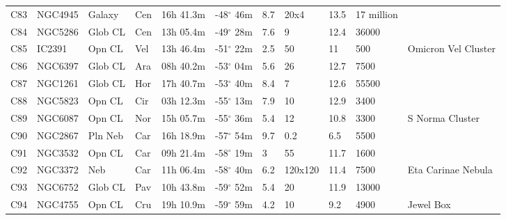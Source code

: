 \documentclass[10pt,twoside,a4paper,english]{article}
\begin{document}
\begin{longtable}{@{}lllllllllll@{}}
C83        & NGC4945     & Galaxy     & Cen       & 16h 41.3m & -48$^{\circ}$ 46m  & 8.7       & 20x4                 & 13.5     & 17 million          &                                 \\ 
C84        & NGC5286     & Glob CL    & Cen       & 13h 05.4m & -49$^{\circ}$ 28m  & 7.6       & 9                    & 12.4     & 36000               &                                 \\ 
C85        & IC2391      & Opn CL     & Vel       & 13h 46.4m & -51$^{\circ}$ 22m  & 2.5       & 50                   & 11       & 500                 & Omicron Vel Cluster             \\ 
C86        & NGC6397     & Glob CL    & Ara       & 08h 40.2m & -53$^{\circ}$ 04m  & 5.6       & 26                   & 12.7     & 7500                &                                 \\ 
C87        & NGC1261     & Glob CL    & Hor       & 17h 40.7m & -53$^{\circ}$ 40m  & 8.4       & 7                    & 12.6     & 55500               &                                 \\ 
C88        & NGC5823     & Opn CL     & Cir       & 03h 12.3m & -55$^{\circ}$ 13m  & 7.9       & 10                   & 12.9     & 3400                &                                 \\ 
C89        & NGC6087     & Opn CL     & Nor       & 15h 05.7m & -55$^{\circ}$ 36m  & 5.4       & 12                   & 10.8     & 3300                & S Norma Cluster                 \\ 
C90        & NGC2867     & Pln Neb    & Car       & 16h 18.9m & -57$^{\circ}$ 54m  & 9.7       & 0.2                  & 6.5      & 5500                &                                 \\ 
C91        & NGC3532     & Opn CL     & Car       & 09h 21.4m & -58$^{\circ}$ 19m  & 3         & 55                   & 11.7     & 1600                &                                 \\ 
C92        & NGC3372     & Neb        & Car       & 11h 06.4m & -58$^{\circ}$ 40m  & 6.2       & 120x120              & 11.4     & 7500                & Eta Carinae Nebula              \\ 
C93        & NGC6752     & Glob CL    & Pav       & 10h 43.8m & -59$^{\circ}$ 52m  & 5.4       & 20                   & 11.9     & 13000               &                                 \\ 
C94        & NGC4755     & Opn CL     & Cru       & 19h 10.9m & -59$^{\circ}$ 59m  & 4.2       & 10                   & 9.2      & 4900                & Jewel Box                       \\ 

\end{longtable}
\end{document}
